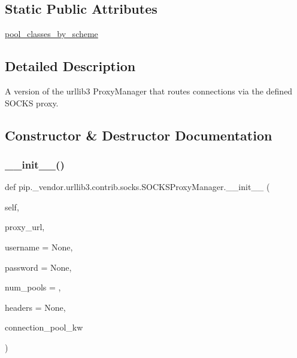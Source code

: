 \subsection*{Static Public Attributes}
\begin{DoxyCompactItemize}
\item 
\hyperlink{classpip_1_1__vendor_1_1urllib3_1_1contrib_1_1socks_1_1SOCKSProxyManager_a515d0500ed301afc362a7a39e35baa20}{pool\+\_\+classes\+\_\+by\+\_\+scheme}
\end{DoxyCompactItemize}


\subsection{Detailed Description}
\begin{DoxyVerb}A version of the urllib3 ProxyManager that routes connections via the
defined SOCKS proxy.
\end{DoxyVerb}
 

\subsection{Constructor \& Destructor Documentation}
\mbox{\label{classpip_1_1__vendor_1_1urllib3_1_1contrib_1_1socks_1_1SOCKSProxyManager_a3309ed03008c9da82a61a7c7b747f2c2}} 
\subsubsection{\texorpdfstring{\+\_\+\+\_\+init\+\_\+\+\_\+()}{\_\_init\_\_()}}
{\footnotesize\ttfamily def pip.\+\_\+vendor.\+urllib3.\+contrib.\+socks.\+S\+O\+C\+K\+S\+Proxy\+Manager.\+\_\+\+\_\+init\+\_\+\+\_\+ (\begin{DoxyParamCaption}\item[{}]{self,  }\item[{}]{proxy\+\_\+url,  }\item[{}]{username = {\ttfamily None},  }\item[{}]{password = {\ttfamily None},  }\item[{}]{num\+\_\+pools = {},  }\item[{}]{headers = {\ttfamily None},  }\item[{}]{connection\+\_\+pool\+\_\+kw }\end{DoxyParamCaption})}




